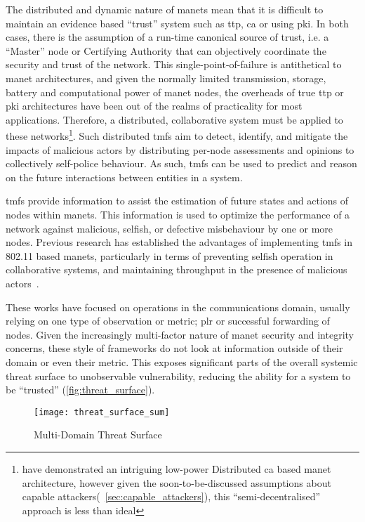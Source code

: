 The distributed and dynamic nature of \glspl{manet} mean that it is difficult to maintain an evidence based ``trust'' system such as \gls{ttp}, \gls{ca} or using \gls{pki}. 
In both cases, there is the assumption of a run-time canonical source of trust, i.e. a ``Master'' node or Certifying Authority that can objectively coordinate the security and trust of the network.
This single-point-of-failure is antithetical to \gls{manet} architectures, and given the normally limited transmission, storage, battery and computational power of \gls{manet} nodes, the overheads of true \gls{ttp} or \gls{pki} architectures have been out of the realms of practicality for most applications.
Therefore, a distributed, collaborative system must be applied to these networks\footnote{\citet{Zouridaki} have demonstrated an intriguing low-power Distributed \gls{ca} based \gls{manet} architecture, however given the soon-to-be-discussed assumptions about capable attackers(~\autoref{sec:capable_attackers}), this ``semi-decentralised'' approach is less than ideal}.
Such distributed \glspl{tmf} aim to detect, identify, and mitigate the impacts of malicious actors by distributing per-node assessments and opinions to collectively self-police behaviour.
As such, \glspl{tmf} can be used to predict and reason on the future interactions between entities in a system.

\glspl{tmf} provide information to assist the estimation of future states and actions of nodes within \glspl{manet}.
This information is used to optimize the performance of a network against malicious, selfish, or defective misbehaviour by one or more nodes.
Previous research has established the advantages of implementing \glspl{tmf} in 802.11 based \glspl{manet}, particularly in terms of preventing selfish operation in collaborative systems, and maintaining throughput in the presence of malicious actors~\cite{Li2007, Buchegger2002}.

These works have focused on operations in the communications domain, usually relying on one type of observation or metric; \gls{plr} or successful forwarding of nodes.
Given the increasingly multi-factor nature of \gls{manet} security and integrity concerns, these style of frameworks do not look at information outside of their domain or even their metric. 
This exposes significant parts of the overall systemic threat surface to unobservable vulnerability, reducing the ability for a system to be ``trusted'' (\autoref{fig:threat_surface}).

\begin{figure}[h!]
	\centering
	\texttt{[image: threat\_surface\_sum]}
	\caption[Multi-Domain Threat Surface]{Multi-Domain Threat Surface}
	\label{fig:threat_surface}
\end{figure}


